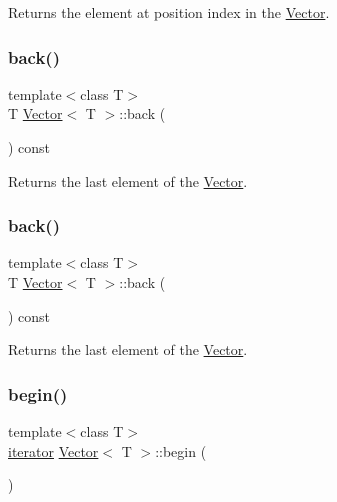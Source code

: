 Returns the element at position \textquotesingle{}index\textquotesingle{} in the \hyperlink{classVector}{Vector}. \mbox{\label{classVector_a50880f90b629b19db48d8fa13adbe7ec}} 
\subsubsection{\texorpdfstring{back()}{back()}\hspace{0.1cm}{\footnotesize\ttfamily [1/2]}}
{\footnotesize\ttfamily template$<$class T$>$ \\
T \hyperlink{classVector}{Vector}$<$ T $>$\+::back (\begin{DoxyParamCaption}{ }\end{DoxyParamCaption}) const\hspace{0.3cm}{\ttfamily [inline]}}

Returns the last element of the \hyperlink{classVector}{Vector}. \mbox{\label{classVector_a50880f90b629b19db48d8fa13adbe7ec}} 
\subsubsection{\texorpdfstring{back()}{back()}\hspace{0.1cm}{\footnotesize\ttfamily [2/2]}}
{\footnotesize\ttfamily template$<$class T$>$ \\
T \hyperlink{classVector}{Vector}$<$ T $>$\+::back (\begin{DoxyParamCaption}{ }\end{DoxyParamCaption}) const\hspace{0.3cm}{\ttfamily [inline]}}

Returns the last element of the \hyperlink{classVector}{Vector}. \mbox{\label{classVector_a466e8c045ea10d62c28b689888e9fe5a}} 
\subsubsection{\texorpdfstring{begin()}{begin()}\hspace{0.1cm}{\footnotesize\ttfamily [1/4]}}
{\footnotesize\ttfamily template$<$class T$>$ \\
\hyperlink{classVector_a45531016f99e90887e0f890f2da943e4}{iterator} \hyperlink{classVector}{Vector}$<$ T $>$\+::begin (\begin{DoxyParamCaption}{ }\end{DoxyParamCaption})\hspace{0.3cm}{\ttfamily [inline]}}

